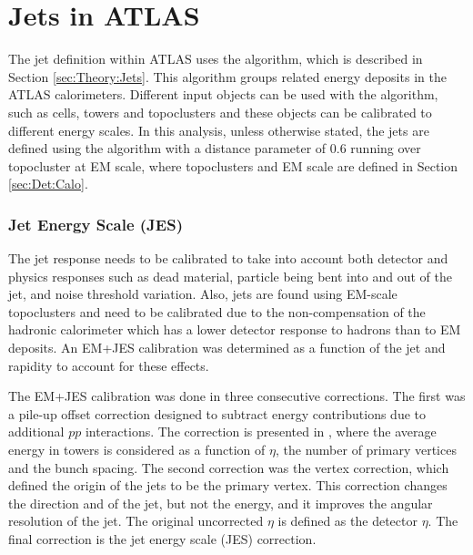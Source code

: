 \section{Jets in ATLAS}
\label{sec:Det:Jets}

The jet definition within ATLAS uses the \antikt{} algorithm, which is described in Section \ref{sec:Theory:Jets}. 
This algorithm groups related energy deposits in the ATLAS calorimeters.
Different input objects can be used with the \antikt{} algorithm, such as cells, towers and topoclusters and these objects can be calibrated to different energy scales.
In this analysis, unless otherwise stated, the jets are defined using the \antikt{} algorithm with a distance parameter of 0.6 running over topocluster at EM scale, where topoclusters and EM scale are defined in Section \ref{sec:Det:Calo}.


\subsubsection{Jet Energy Scale (JES)}

The jet response needs to be calibrated to take into account both detector and physics responses such as dead material, particle being bent into and  out of the jet, and noise threshold variation. 
Also, jets are found using EM-scale topoclusters and need to be calibrated due to the non-compensation of the hadronic calorimeter which has a lower detector response to hadrons than to EM deposits.
An EM+JES calibration was determined as a function of the jet \pt{} and rapidity to account for these effects.

The EM+JES calibration was done in three consecutive corrections.
The first was a pile-up offset correction designed to subtract energy contributions due to additional $pp$ interactions.
The correction is presented in \cite{ref:OffsetCorrection}, where the average energy in towers is considered as a function of $\eta{}$, the number of primary vertices and the bunch spacing.
The second correction was the vertex correction, which defined the origin of the jets to be the primary vertex.
This correction changes the direction and \pt{} of the jet, but not the energy, and it improves the angular resolution of the jet.
The original uncorrected $\eta{}$ is defined as the detector $\eta$.
The final correction is the jet energy scale (JES) correction.

